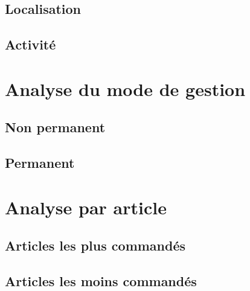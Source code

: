 \documentclass{beamer}
\begin{document}
    \subsection{Localisation}

    \begin{frame}
    \end{frame}

    \subsection{Activité}

    \begin{frame}
    \end{frame}

    \section{Analyse du mode de gestion}
    \subsection{Non permanent}

    \begin{frame}
    \end{frame}

    \subsection{Permanent}

    \begin{frame}
    \end{frame}

    \section{Analyse par article}
    \subsection{Articles les plus commandés}

    \begin{frame}
    \end{frame}

    \subsection{Articles les moins commandés}

    \begin{frame}
    \end{frame}
\end{document}
